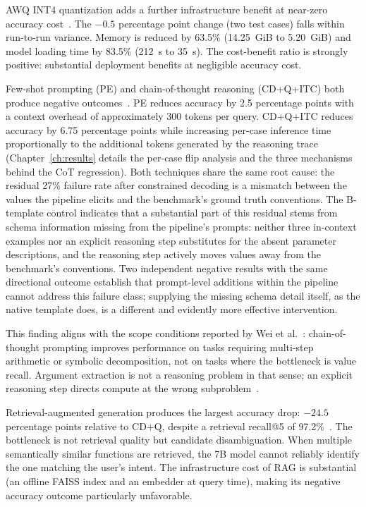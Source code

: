 AWQ INT4 quantization adds a further infrastructure benefit at near-zero
accuracy cost~\cite{lin2024awq}. The $-0.5$ percentage point change (two
test cases) falls within run-to-run variance. Memory is reduced by 63.5\%
(14.25~GiB to 5.20~GiB) and model loading time by 83.5\% (212~s to 35~s).
The cost-benefit ratio is strongly positive: substantial deployment benefits
at negligible accuracy cost.

Few-shot prompting (PE) and chain-of-thought reasoning
(CD+Q+ITC) both produce negative outcomes~\cite{brown2020language,
wei2022chain}. PE reduces accuracy by 2.5 percentage points with a
context overhead of approximately 300 tokens per query. CD+Q+ITC
reduces accuracy by 6.75 percentage points while increasing per-case
inference time proportionally to the additional tokens generated by the
reasoning trace (Chapter~\ref{ch:results} details the per-case flip
analysis and the three mechanisms behind the CoT regression). Both
techniques share the same root cause: the residual 27\% failure rate
after constrained decoding is a mismatch between the values the
pipeline elicits and the benchmark's ground truth conventions. The
B-template control indicates that a substantial part of this residual
stems from schema information missing from the pipeline's prompts:
neither three in-context examples nor an explicit reasoning step
substitutes for the absent parameter descriptions, and the reasoning
step actively moves values away from the benchmark's conventions. Two
independent negative results with the same directional outcome
establish that prompt-level additions within the pipeline cannot
address this failure class; supplying the missing schema detail itself,
as the native template does, is a different and evidently more
effective intervention.

This finding aligns with the scope conditions reported by Wei et
al.~\cite{wei2022chain}: chain-of-thought prompting improves performance
on tasks requiring multi-step arithmetic or symbolic decomposition, not
on tasks where the bottleneck is value recall. Argument extraction is
not a reasoning problem in that sense; an explicit reasoning step
directs compute at the wrong subproblem~\cite{snell2024scaling}.

Retrieval-augmented generation produces the largest accuracy drop: $-24.5$
percentage points relative to CD+Q, despite a retrieval recall@5 of
97.2\%~\cite{lewis2020retrieval}. The bottleneck is not retrieval quality
but candidate disambiguation. When multiple semantically similar functions
are retrieved, the 7B model cannot reliably identify the one matching the
user's intent. The infrastructure cost of RAG is substantial (an offline
FAISS index and an embedder at query time), making its negative accuracy
outcome particularly unfavorable.

